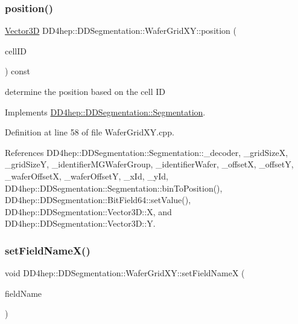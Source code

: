 \subsubsection{\texorpdfstring{position()}{position()}}
{\footnotesize\ttfamily \hyperlink{struct_d_d4hep_1_1_d_d_segmentation_1_1_vector3_d}{Vector3D} D\+D4hep\+::\+D\+D\+Segmentation\+::\+Wafer\+Grid\+X\+Y\+::position (\begin{DoxyParamCaption}\item[{const \hyperlink{namespace_d_d4hep_1_1_d_d_segmentation_ac7af071d85cb48820914434a07e21ba1}{Cell\+ID} \&}]{cell\+ID }\end{DoxyParamCaption}) const\hspace{0.3cm}{\ttfamily [virtual]}}



determine the position based on the cell ID 



Implements \hyperlink{class_d_d4hep_1_1_d_d_segmentation_1_1_segmentation_a594fe6d78667415855858d083b64acad}{D\+D4hep\+::\+D\+D\+Segmentation\+::\+Segmentation}.



Definition at line 58 of file Wafer\+Grid\+X\+Y.\+cpp.



References D\+D4hep\+::\+D\+D\+Segmentation\+::\+Segmentation\+::\+\_\+decoder, \+\_\+grid\+SizeX, \+\_\+grid\+SizeY, \+\_\+identifier\+M\+G\+Wafer\+Group, \+\_\+identifier\+Wafer, \+\_\+offsetX, \+\_\+offsetY, \+\_\+wafer\+OffsetX, \+\_\+wafer\+OffsetY, \+\_\+x\+Id, \+\_\+y\+Id, D\+D4hep\+::\+D\+D\+Segmentation\+::\+Segmentation\+::bin\+To\+Position(), D\+D4hep\+::\+D\+D\+Segmentation\+::\+Bit\+Field64\+::set\+Value(), D\+D4hep\+::\+D\+D\+Segmentation\+::\+Vector3\+D\+::X, and D\+D4hep\+::\+D\+D\+Segmentation\+::\+Vector3\+D\+::Y.

\hypertarget{class_d_d4hep_1_1_d_d_segmentation_1_1_wafer_grid_x_y_a4306fcd58177d9f24abd274a944eca6f}{}\label{class_d_d4hep_1_1_d_d_segmentation_1_1_wafer_grid_x_y_a4306fcd58177d9f24abd274a944eca6f} 
\subsubsection{\texorpdfstring{set\+Field\+Name\+X()}{setFieldNameX()}}
{\footnotesize\ttfamily void D\+D4hep\+::\+D\+D\+Segmentation\+::\+Wafer\+Grid\+X\+Y\+::set\+Field\+NameX (\begin{DoxyParamCaption}\item[{const std\+::string \&}]{field\+Name }\end{DoxyParamCaption})\hspace{0.3cm}{\ttfamily [inline]}}



